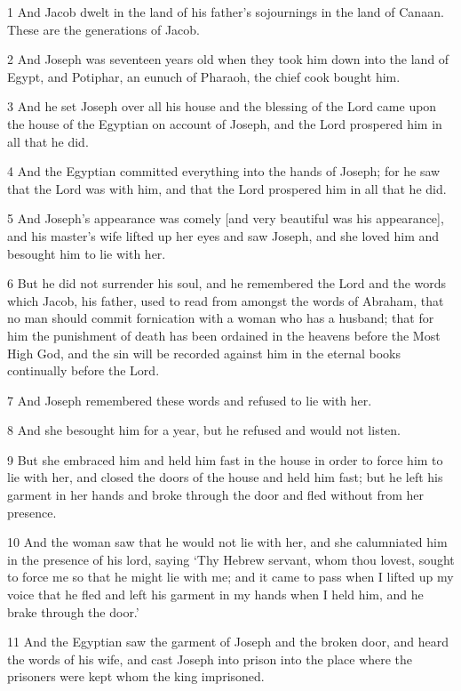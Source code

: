 \par 1 And Jacob dwelt in the land of his father's sojournings in the land of Canaan. These are the generations of Jacob.
\par 2 And Joseph was seventeen years old when they took him down into the land of Egypt, and Potiphar, an eunuch of Pharaoh, the chief cook bought him.
\par 3 And he set Joseph over all his house and the blessing of the Lord came upon the house of the Egyptian on account of Joseph, and the Lord prospered him in all that he did.
\par 4 And the Egyptian committed everything into the hands of Joseph; for he saw that the Lord was with him, and that the Lord prospered him in all that he did.
\par 5 And Joseph's appearance was comely [and very beautiful was his appearance], and his master's wife lifted up her eyes and saw Joseph, and she loved him and besought him to lie with her.
\par 6 But he did not surrender his soul, and he remembered the Lord and the words which Jacob, his father, used to read from amongst the words of Abraham, that no man should commit fornication with a woman who has a husband; that for him the punishment of death has been ordained in the heavens before the Most High God, and the sin will be recorded against him in the eternal books continually before the Lord.
\par 7 And Joseph remembered these words and refused to lie with her.
\par 8 And she besought him for a year, but he refused and would not listen.
\par 9 But she embraced him and held him fast in the house in order to force him to lie with her, and closed the doors of the house and held him fast; but he left his garment in her hands and broke through the door and fled without from her presence.
\par 10 And the woman saw that he would not lie with her, and she calumniated him in the presence of his lord, saying ‘Thy Hebrew servant, whom thou lovest, sought to force me so that he might lie with me; and it came to pass when I lifted up my voice that he fled and left his garment in my hands when I held him, and he brake through the door.’
\par 11 And the Egyptian saw the garment of Joseph and the broken door, and heard the words of his wife, and cast Joseph into prison into the place where the prisoners were kept whom the king imprisoned.
